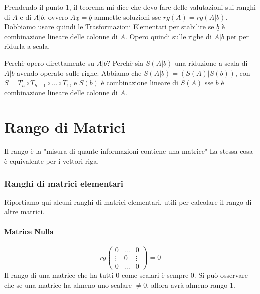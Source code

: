 Prendendo il punto 1, il teorema mi dice che devo fare delle valutazioni sui ranghi di $A$ e di $A|b$, ovvero 
$A\underline{x} =\underline{b}$ ammette soluzioni sse $rg(A) = rg(A|b)$.
Dobbiamo usare quindi le Trasformazioni Elementari per stabilire se $\underline{b}$ è combinazione lineare delle colonne di $A$.
Opero quindi sulle righe di $A|b$ per per ridurla a scala.

Perchè opero direttamente su $A|b$? Perchè sia $S(A|b)$ una riduzione a scala di $A|b$ avendo operato sulle righe.
Abbiamo che $S(A|b) = (S(A) | S(b))$, con $S= T_h \circ T_{h-1} \circ ... \circ T_1$, e $S(b)$ è combinazione lineare di $S(A)$ sse 
$b$ è combinazione lineare delle colonne di $A$. 

\section{Rango di Matrici}
Il rango è la "misura di quante informazioni contiene una matrice"
La stessa cosa è equivalente per i vettori riga.

\subsubsection*{Ranghi di matrici elementari}
Riportiamo qui alcuni ranghi di matrici elementari, utili per calcolare il rango di altre matrici.
\paragraph{Matrice Nulla}
\[ rg
	\begin{pmatrix}
		0      & ... & 0      \\
		\vdots & 0   & \vdots \\
		0      & ... & 0
	\end{pmatrix}
	= 0
\]
Il rango di una matrice che ha tutti $0$ come scalari è sempre $0$.
Si può osservare che se una matrice ha almeno uno scalare $\neq 0$, allora avrà almeno rango $1$.

